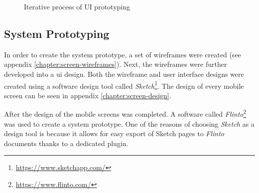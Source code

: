     \begin{figure}[ht]
    \centering
    \caption{Iterative process of UI prototyping}
    \label{figure:ui-design-process}
    \end{figure}
    
        \subsection{System Prototyping}
        In order to create the system prototype, a set of wireframes were created (see appendix \ref{chapter:screen-wireframes}). Next, the wireframes were further developed into a \gls{ui} design. Both the wireframe and user interface designs were created using a software design tool called \textit{Sketch}\footnote{\url{https://www.sketchapp.com/}}. The design of every mobile screen can be seen in appendix \ref{chapter:screen-design}. 
        
        After the design of the mobile screens was completed. A software called \textit{Flinto}\footnote{\url{https://www.flinto.com/}} was used to create a system prototype. One of the reasons of choosing \textit{Sketch} as a design tool is because it allows for easy export of Sketch pages to \textit{Flinto} documents thanks to a dedicated plugin.
        
